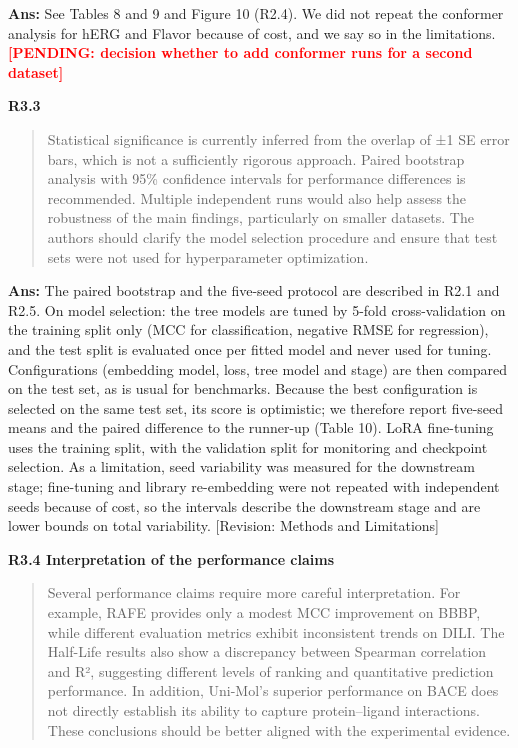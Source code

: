 \documentclass[
  10pt,
]{article}
\newcommand{\placeholder}[1]{\textcolor{red}{\textbf{[PENDING#1]}}}
\begin{document}
\textbf{Ans:} See Tables 8 and 9 and Figure 10 (R2.4). We did not repeat
the conformer analysis for hERG and Flavor because of cost, and we say
so in the limitations. \placeholder{: decision whether to add
conformer runs for a second dataset}

\textbf{R3.3}

\begin{quote}
Statistical significance is currently inferred from the overlap of ±1 SE
error bars, which is not a sufficiently rigorous approach. Paired
bootstrap analysis with 95\% confidence intervals for performance
differences is recommended. Multiple independent runs would also help
assess the robustness of the main findings, particularly on smaller
datasets. The authors should clarify the model selection procedure and
ensure that test sets were not used for hyperparameter optimization.
\end{quote}

\textbf{Ans:} The paired bootstrap and the five-seed protocol are
described in R2.1 and R2.5. On model selection: the tree models are
tuned by 5-fold cross-validation on the training split only (MCC for
classification, negative RMSE for regression), and the test split is
evaluated once per fitted model and never used for tuning.
Configurations (embedding model, loss, tree model and stage) are then
compared on the test set, as is usual for benchmarks. Because the best
configuration is selected on the same test set, its score is optimistic;
we therefore report five-seed means and the paired difference to the
runner-up (Table 10). LoRA fine-tuning uses the training split, with the
validation split for monitoring and checkpoint selection. As a
limitation, seed variability was measured for the downstream stage;
fine-tuning and library re-embedding were not repeated with independent
seeds because of cost, so the intervals describe the downstream stage
and are lower bounds on total variability. {[}Revision: Methods and
Limitations{]}

\textbf{R3.4 Interpretation of the performance claims}

\begin{quote}
Several performance claims require more careful interpretation. For
example, RAFE provides only a modest MCC improvement on BBBP, while
different evaluation metrics exhibit inconsistent trends on DILI. The
Half-Life results also show a discrepancy between Spearman correlation
and R², suggesting different levels of ranking and quantitative
prediction performance. In addition, Uni-Mol's superior performance on
BACE does not directly establish its ability to capture protein--ligand
interactions. These conclusions should be better aligned with the
experimental evidence.
\end{quote}
\end{document}
